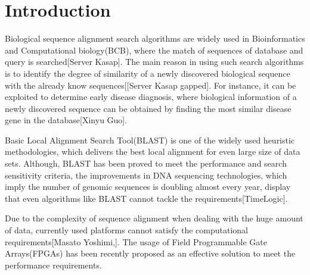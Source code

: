 \section{Introduction}
\label{sec:introduction}


Biological sequence alignment search algorithms are widely used in Bioinformatics and Computational biology(BCB), where the match of sequences of database and query is searched[Server Kasap]. The main reason in using such search algorithms is to identify the degree of similarity of a newly discovered biological sequence with the already know sequences[[Server Kasap gapped]. For instance, it can be exploited to determine early disease diagnosis, where biological information of a newly discovered sequence can be obtained by finding the most similar disease gene in the database[Xinyu Guo].


Basic Local Alignment Search Tool(BLAST) is one of the widely used heuristic methodologies, which delivers the best local alignment for even large size of data sets. Although, BLAST has been proved to meet the performance and search sensitivity criteria, the improvements in DNA sequencing technologies, which imply the number of genomic sequences is doubling almost every year, display that even algorithms like BLAST cannot tackle the requirements[TimeLogic]. 


Due to the complexity of sequence alignment when dealing with the huge amount of data, currently used platforms cannot satisfy the computational requirements[Masato Yoshimi,]. The usage of Field Programmable Gate Arrays(FPGAs) has been recently proposed as an effective solution to meet the performance requirements. 


